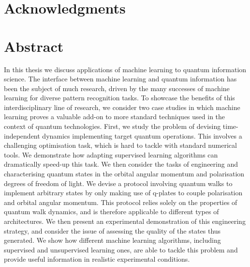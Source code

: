 \clearpage


\chapter*{Acknowledgments}

\clearpage


\chapter*{Abstract}

In this thesis we discuss applications of machine learning to quantum information science.
The interface between machine learning and quantum information has been the subject of much research, driven by the many successes of machine learning for diverse pattern recognition tasks.
To showcase the benefits of this interdisciplinary line of research, we consider two case studies in which machine learning proves a valuable add-on to more standard techniques used in the context of quantum technologies.
First, we study the problem of devising time-independent dynamics implementing target quantum operations.
This involves a challenging optimisation task, which is hard to tackle with standard numerical tools.
We demonstrate how adapting supervised learning algorithms can dramatically speed-up this task.
We then consider the tasks of engineering and characterising quantum states in the orbital angular momentum and polarisation degrees of freedom of light.
We devise a protocol involving quantum walks to implement arbitrary states by only making use of q-plates to couple polarisation and orbital angular momentum.
This protocol relies solely on the properties of quantum walk dynamics, and is therefore applicable to different types of architectures.
We then present an experimental demonstration of this engineering strategy, and consider the issue of assessing the quality of the states thus generated.
We show how different machine learning algorithms, including supervised and unsupervised learning ones, are able to tackle this problem and provide useful information in realistic experimental conditions.


\clearpage


\tableofcontents



\clearpage

